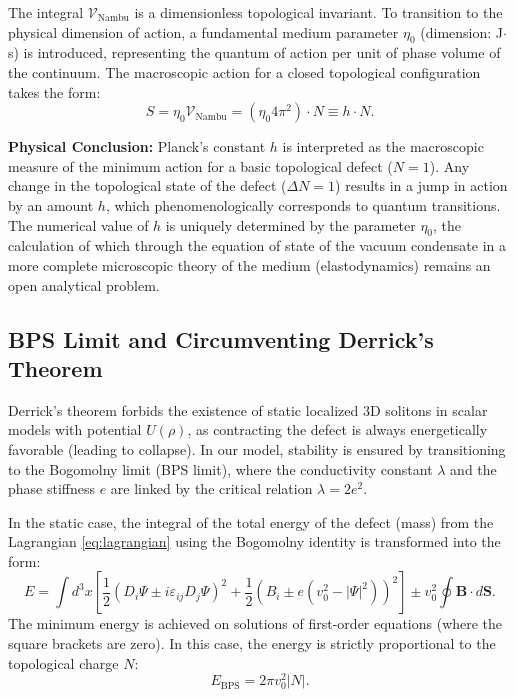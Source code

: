 \documentclass[11pt,a4paper]{article}
\begin{document}
The integral $\mathcal{V}_{\text{Nambu}}$ is a dimensionless topological invariant. To transition to the physical dimension of action, a fundamental medium parameter $\eta_0$ (dimension: J$\cdot$s) is introduced, representing the quantum of action per unit of phase volume of the continuum. The macroscopic action for a closed topological configuration takes the form:
\begin{equation}
	S = \eta_0 \mathcal{V}_{\text{Nambu}} = (\eta_0 4\pi^2) \cdot N \equiv h \cdot N.
\end{equation}

\textbf{Physical Conclusion:} Planck's constant $h$ is interpreted as the macroscopic measure of the minimum action for a basic topological defect ($N=1$). Any change in the topological state of the defect ($\Delta N = 1$) results in a jump in action by an amount $h$, which phenomenologically corresponds to quantum transitions. The numerical value of $h$ is uniquely determined by the parameter $\eta_0$, the calculation of which through the equation of state of the vacuum condensate in a more complete microscopic theory of the medium (elastodynamics) remains an open analytical problem.

\subsection{BPS Limit and Circumventing Derrick's Theorem}
Derrick's theorem forbids the existence of static localized 3D solitons in scalar models with potential $U(\rho)$, as contracting the defect is always energetically favorable (leading to collapse).
In our model, stability is ensured by transitioning to the Bogomolny limit (BPS limit), where the conductivity constant $\lambda$ and the phase stiffness $e$ are linked by the critical relation $\lambda = 2e^2$.

In the static case, the integral of the total energy of the defect (mass) from the Lagrangian \eqref{eq:lagrangian} using the Bogomolny identity is transformed into the form:
\begin{equation}
E = \int d^3x \left[ \frac{1}{2} \left( D_i \Psi \pm i \varepsilon_{ij} D_j \Psi \right)^2 + \frac{1}{2} \left( B_i \pm e(v_0^2 - |\Psi|^2) \right)^2 \right] \pm v_0^2 \oint \mathbf{B} \cdot d\mathbf{S}.
\end{equation}
The minimum energy is achieved on solutions of first-order equations (where the square brackets are zero). In this case, the energy is strictly proportional to the topological charge $N$:
\begin{equation}
E_{\text{BPS}} = 2\pi v_0^2 |N|.
\label{eq:bps_energy}
\end{equation}
\end{document}

